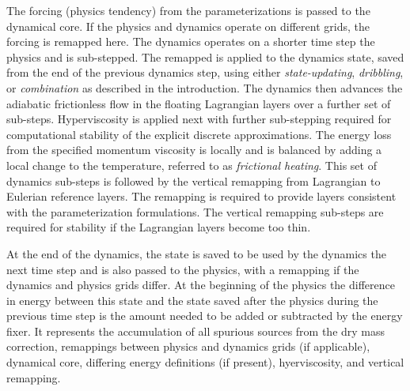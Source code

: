 \documentclass[draft,linenumbers]{agujournal}
\begin{document}
The forcing (physics tendency) from the parameterizations is passed to the dynamical core. If the physics and dynamics operate on different grids, the forcing is remapped here. The dynamics operates on a shorter time step {\color{red}{than}} the physics and is sub-stepped. The remapped {\color{red}{physics increment}} is applied to the dynamics state, saved from the end of the previous dynamics step, using either {\em{state-updating}}, {\em{dribbling}}, or {\em{combination}} as described in the introduction. The dynamics then advances the adiabatic frictionless flow in the floating Lagrangian layers over a further set of sub-steps. Hyperviscosity is applied next with further sub-stepping required for computational stability of the explicit discrete approximations. The energy loss from the specified momentum viscosity is {\color{red}{calculated}} locally and is balanced by adding a local change to the temperature, referred to as {\em{frictional heating}}. This set of dynamics sub-steps is followed by the vertical remapping from Lagrangian to Eulerian reference layers. The remapping is required to provide layers consistent with the parameterization formulations. The vertical remapping sub-steps are required for stability if the Lagrangian layers become too thin.

At the end of the dynamics, the state is saved to be used by the dynamics the next time step and is also passed to the physics, with a remapping if the dynamics and physics grids differ. At the beginning of the physics the difference in energy between this state and the state saved after the physics during the previous time step is the amount needed to be added or subtracted by the energy fixer. It represents the accumulation of all spurious sources from the dry mass correction, remappings between physics and dynamics grids (if applicable), dynamical core, differing energy definitions (if present), hyerviscosity, and vertical remapping.
\end{document}
